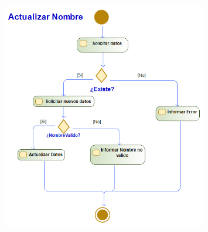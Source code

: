 \begin{figure}[H]
    \centering
    \includegraphics[width=0.8\textwidth]{Use_Cases/Actualizar Nombre.png}
\end{figure}
\newpage

